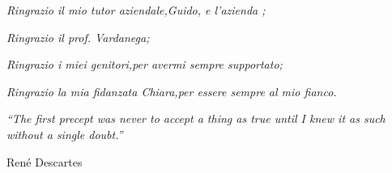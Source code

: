\setlength{}
\setlength\epigraphrule{0pt}

\begin{flushright}
   \large{\textit{Ringrazio il mio tutor aziendale,\linebreak Guido, e l'azienda \nomeAzienda{};}}
\end{flushright}

\begin{flushright}
   \large{\textit{Ringrazio il prof. Vardanega;}}
\end{flushright}

\begin{flushright}
   \large{\textit{Ringrazio i miei genitori,\linebreak per avermi sempre supportato;}}
\end{flushright}

\begin{flushright}
   \large{\textit{Ringrazio la mia fidanzata Chiara,\linebreak per essere sempre al mio fianco.}}
\end{flushright}

\vspace*{\fill}

\epigraph{\textit{``The first precept was never to accept a thing as true until I knew it as such without a single doubt.''}}{René Descartes}